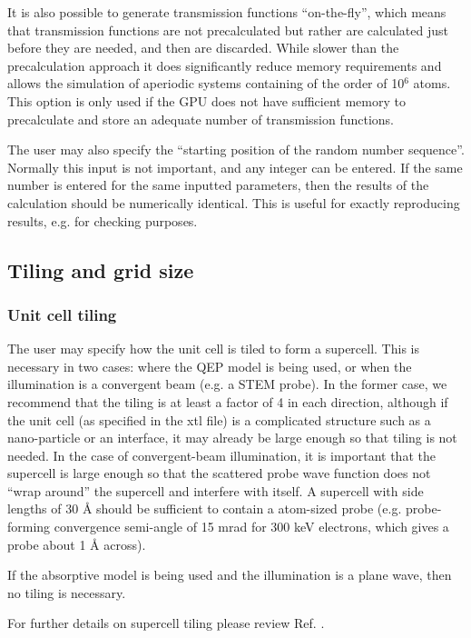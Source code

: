 \documentclass[12pt,a4paper]{article}
\begin{document}
It is also possible to generate transmission functions ``on-the-fly'', which means that transmission functions are not precalculated but rather are calculated just before they are needed, and then are discarded.
While slower than the precalculation approach it does significantly reduce memory requirements and allows the simulation of aperiodic systems containing of the order of 10$^{6}$ atoms.
This option is only used if the GPU does not have sufficient memory to precalculate and store an adequate number of transmission functions.

The user may also specify the ``starting position of the random number sequence''.
Normally this input is not important, and any integer can be entered.
If the same number is entered for the same inputted parameters, then the results of the calculation should be numerically identical.
This is useful for exactly reproducing results, e.g. for checking purposes.



\subsection{Tiling and grid size}

\subsubsection{Unit cell tiling}
\label{sec:tiling}

The user may specify how the unit cell is tiled to form a supercell.
This is necessary in two cases: where the QEP model is being used, or when the illumination is a convergent beam (e.g. a STEM probe).
In the former case, we recommend that the tiling is at least a factor of 4 in each direction, although if the unit cell (as specified in the xtl file) is a complicated structure such as a nano-particle or an interface, it may already be large enough so that tiling is not needed.
In the case of convergent-beam illumination, it is important that the supercell is large enough so that the scattered probe wave function does not ``wrap around'' the supercell and interfere with itself.
A supercell with side lengths of 30 \AA{} should be sufficient to contain a atom-sized probe (e.g. probe-forming convergence semi-angle of 15 mrad for 300 keV electrons, which gives a probe about 1 \AA{} across).

If the absorptive model is being used and the illumination is a plane wave, then no tiling is necessary.

For further details on supercell tiling please review Ref. \cite{FAOR1}. 
\end{document}
